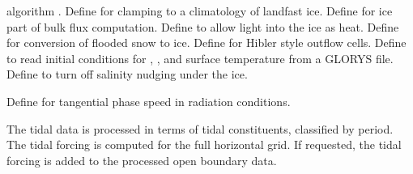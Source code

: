 \begin{klist}
\begin{klist}
\begin{klist}
	  algorithm \citep{Lemieux_2015}.
	 Define for clamping to a
	  climatology of landfast ice.
	 Define for ice part of bulk flux
	  computation.
	 Define to allow light into the ice as heat.
	 Define for conversion of flooded snow
 	  to ice.
	 Define for Hibler style outflow cells.
	 Define to read initial conditions
	  for , , and surface temperature from a
	  GLORYS file.
	 Define to turn off salinity
          nudging under the ice.
      \end{klist}
  \end{klist}
   \mbox{}
  \begin{klist}
       Define for tangential phase speed in
     radiation conditions.
  \end{klist}
   \mbox{}
The tidal data is processed in terms of tidal constituents, classified by
period. The tidal forcing is computed for the full horizontal grid.
If requested, the tidal forcing is added to the processed open
boundary data.


\end{klist}

